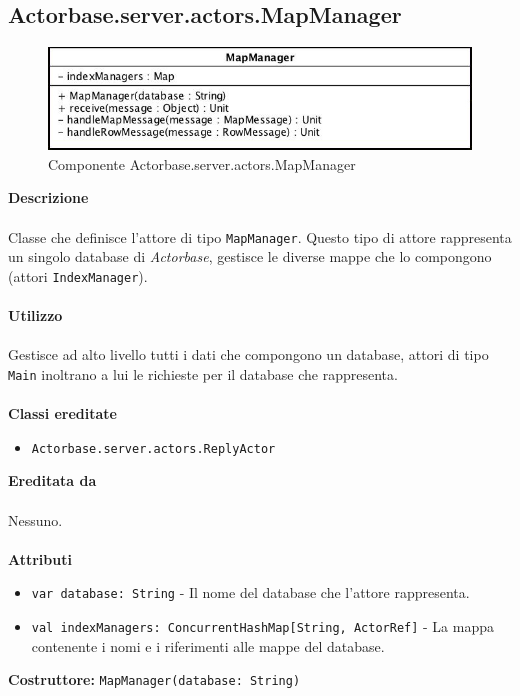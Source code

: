 \documentclass[a4paper]{article}
\begin{document}
	\subsection{Actorbase.server.actors.MapManager}
		\begin{figure}[H]
			\centering
			\includegraphics[width=\textwidth]{Server/mapmanager.jpg}
			\caption{Componente Actorbase.server.actors.MapManager}
		\end{figure}
		\textbf{Descrizione}
			\\ \\
			Classe che definisce l'attore di tipo \texttt{MapManager}. Questo tipo di attore rappresenta un singolo database di \emph{Actorbase}, gestisce le diverse mappe che lo compongono (attori \texttt{IndexManager}).
			\\ \\
		\textbf{Utilizzo}
			\\ \\
			Gestisce ad alto livello tutti i dati che compongono un database, attori di tipo \texttt{Main} inoltrano a lui le richieste per il database che rappresenta.
			\\ \\
		\textbf{Classi ereditate}
			\begin{itemize}
				\item \texttt{Actorbase.server.actors.ReplyActor}
			\end{itemize}
		\textbf{Ereditata da}
			\\ \\
			Nessuno.
			\\ \\
		\textbf{Attributi}
			\begin{itemize}
				\item \texttt{var database: String} - Il nome del database che l'attore rappresenta. 
				\item \texttt{val indexManagers: ConcurrentHashMap[String, ActorRef]} - La mappa contenente i nomi e i riferimenti alle mappe del database.
			\end{itemize}
		\textbf{Costruttore: }\texttt{MapManager(database: String)}
			\\ \\
\end{document}
